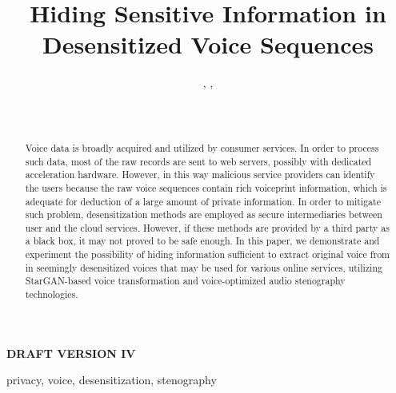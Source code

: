 \documentclass[journal]{IEEEtran} %
\begin{document}
\title{Hiding Sensitive Information in Desensitized Voice Sequences}

\author{%
    , %
    , %
    \\%
    \\%
    \\%
}

\maketitle

\textbf{DRAFT VERSION IV}

\begin{abstract}
Voice data is broadly acquired and utilized by consumer services. In order to process such data, most of the raw records are sent to web servers, possibly with dedicated acceleration hardware. However, in this way malicious service providers can identify the users because the raw voice sequences contain rich voiceprint information, which is adequate for deduction of a large amount of private information. In order to mitigate such problem, desensitization methods are employed as secure intermediaries between user and the cloud services. However, if these methods are provided by a third party as a black box, it may not proved to be safe enough. In this paper, we demonstrate and experiment the possibility of hiding information sufficient to extract original voice from in seemingly desensitized voices that may be used for various online services, utilizing StarGAN-based voice transformation and voice-optimized audio stenography technologies.
\end{abstract}

\begin{IEEEkeywords}
    privacy, voice, desensitization, stenography
\end{IEEEkeywords}
\end{document}
